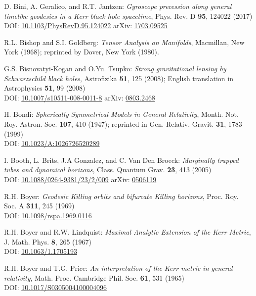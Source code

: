 \begin{thebibliography}{123}
D. Bini, A. Geralico, and R.T. Jantzen:
{\em Gyroscope precession along general timelike geodesics in a Kerr black hole spacetime},
Phys. Rev. D {\bf 95}, 124022 (2017)\\
DOI: \href{https://doi.org/10.1103/PhysRevD.95.124022}{10.1103/PhysRevD.95.124022}\hfill
arXiv: \href{https://arxiv.org/abs/1703.09525}{1703.09525}

R.L. Bishop and S.I. Goldberg:
{\em Tensor Analysis on Manifolds},
Macmillan, New York (1968); reprinted by Dover, New York (1980).

G.S. Bisnovatyi-Kogan and O.Yu. Tsupko:
{\em Strong gravitational lensing by Schwarzschild black holes},
Astrofizika {\bf 51}, 125 (2008); English translation in
Astrophysics {\bf 51}, 99 (2008)\\
DOI: \href{https://doi.org/10.1007/s10511-008-0011-8}{10.1007/s10511-008-0011-8}\hfill
arXiv: \href{https://arxiv.org/abs/0803.2468}{0803.2468}

H. Bondi:
{\em Spherically Symmetrical Models in General Relativity},
Month. Not. Roy. Astron. Soc. {\bf 107}, 410 (1947);
reprinted in
Gen. Relativ. Gravit. {\bf 31}, 1783 (1999)\\
DOI: \href{https://doi.org/10.1023/10.1023/A:1026726520289}{10.1023/A:1026726520289}

I. Booth, L. Brits, J.A Gonzalez, and C. Van Den Broeck:
{\em Marginally trapped tubes and dynamical horizons},
Class. Quantum Grav. {\bf 23}, 413 (2005)\\
DOI: \href{https://doi.org/10.1088/0264-9381/23/2/009}{10.1088/0264-9381/23/2/009}\hfill
arXiv: \href{https://arxiv.org/abs/gr-qc/0506119}{0506119}

R.H. Boyer: {\em Geodesic Killing orbits and bifurcate Killing horizons},
Proc. Roy. Soc. A {\bf 311}, 245 (1969)\\
DOI: \href{https://doi.org/10.1098/rspa.1969.0116}{10.1098/rspa.1969.0116}

R.H. Boyer and R.W. Lindquist: {\em Maximal Analytic Extension of the Kerr Metric},
J. Math. Phys. {\bf 8}, 265 (1967)\\
DOI: \href{https://doi.org/10.1063/1.1705193}{10.1063/1.1705193}

R.H. Boyer and T.G. Price: {\em An interpretation of the Kerr metric in general relativity},
Math. Proc. Cambridge Phil. Soc. {\bf 61}, 531 (1965)\\
DOI: \href{https://doi.org/10.1017/S0305004100004096}{10.1017/S0305004100004096}


\end{thebibliography}

